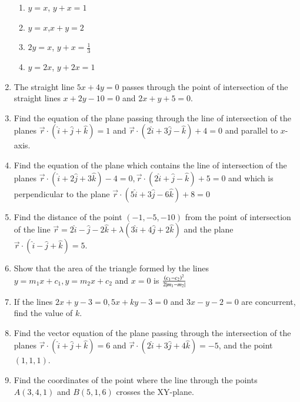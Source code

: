 \begin{enumerate}[label=\thesubsection.\arabic*,ref=\thesubsection.\theenumi]
\begin{enumerate}
\item $y=x$, $y+x=1$
\item $y=x$,$x+y=2$
\item $2y=x$, $y+x=\frac{1}{3}$
\item $y=2x$, $y+2x=1$
\end{enumerate}
\item The straight line $5x+4y=0$ passes through the point of intersection of the straight lines $x+2y-10=0$ and $2x+y+5=0$.
\item Find the equation of the plane passing through the line of intersection of the planes  $\overrightarrow{r}\cdot(\hat{i}+\hat{j}+\hat{k})=1$ and $\overrightarrow{r}\cdot(2\hat{i}+3\hat{j}-\hat{k})+4=0$ and parallel to $x$-axis.
\item Find the equation of the plane which contains the line of intersection of the planes $\overrightarrow{r}\cdot(\hat{i}+2\hat{j}+3\hat{k})-4=0, \overrightarrow{r} \cdot  (2\hat{i}+\hat{j}-\hat{k})+5=0$ and which is perpendicular to the plane $\overrightarrow{r}\cdot(5\hat{i}+3\hat{j}-6\hat{k})+8=0$
\item Find the distance of the point $(-1,-5,-10)$ from the point of intersection of the line $\overrightarrow{r}=2\hat{i}-\hat{j}-2\hat{k}+\lambda(3\hat{i}+4\hat{j}+2\hat{k})$ and the plane $\overrightarrow{r}\cdot(\hat{i}-\hat{j}+\hat{k})=5$.
\item Show that the area of the triangle formed by the lines $y=m_1x+c_1, y=m_2x+c_2$ and $x=0$ is $\frac{\left(c_1-c_2\right)^2}{2\left\vert m_1-m_2\right\vert}$
\item If the lines $2x+y-3=0, 5x+ky-3=0$ and $3x-y-2=0$ are concurrent, find the value of $k$.
\item Find the vector equation of the plane passing through the intersection of the planes $\overrightarrow{r} \cdot (\hat{i} +\hat{j} +\hat{k})=6$ and $\overrightarrow{r} \cdot (2\hat{i} +3\hat{j} +4\hat{k})=-5$, and the point $(1, 1, 1)$.
\item Find the coordinates of the point where the line through the points $A(3,4,1)$ and $B(5, 1, 6)$ crosses the XY-plane.
\end{enumerate}
